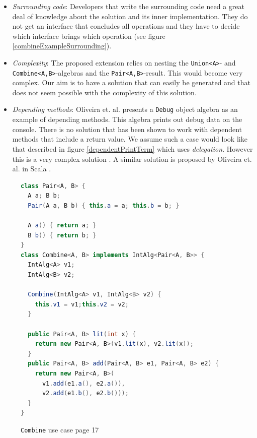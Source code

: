\documentclass{report}
\begin{document}
\begin{itemize}
  \item \emph{Surrounding code}: Developers that write the surrounding code need a great deal of knowledge about the solution and its inner implementation. They do not get an interface that concludes all operations and they have to decide which interface brings which operation (see figure \ref{combineExampleSurrounding}).
  \item \emph{Complexity}: The proposed extension relies on nesting the \lstinline{Union<A>}- and \lstinline{Combine<A,B>}-algebras and the \lstinline{Pair<A,B>}-result. This would become very complex. Our aim is to have a solution that can easily be generated and that does not seem possible with the complexity of this solution.
  \item \emph{Depending methods}: Oliveira et. al. presents a \lstinline{Debug} object algebra as an example of depending methods. This algebra prints out debug data on the console. There is no solution that has been shown to work with dependent methods that include a return value. We assume such a case would look like that described in figure \ref{dependentPrintTerm} which uses \emph{delegation}. However this is a very complex solution \cite{Tempero-Multiple-2000}. A similar solution is proposed by Oliveira et. al. in Scala \cite{Oliv-Feature-2013}.
\end{itemize}

\begin{figure}[H]
\begin{lstlisting}[language=java]
class Pair<A, B> {
  A a; B b;
  Pair(A a, B b) { this.a = a; this.b = b; }

  A a() { return a; }
  B b() { return b; }
}
class Combine<A, B> implements IntAlg<Pair<A, B>> {
  IntAlg<A> v1;
  IntAlg<B> v2;

  Combine(IntAlg<A> v1, IntAlg<B> v2) {
    this.v1 = v1;this.v2 = v2;
  }
  
  public Pair<A, B> lit(int x) {
    return new Pair<A, B>(v1.lit(x), v2.lit(x));
  }
  public Pair<A, B> add(Pair<A, B> e1, Pair<A, B> e2) {
    return new Pair<A, B>(
      v1.add(e1.a(), e2.a()),
      v2.add(e1.b(), e2.b()));
  }
}
\end{lstlisting}
\caption{\lstinline{Combine} use case \cite{Oliv-Extensibility-2012} page 17}
\label{combineExampleOliv}
\end{figure}
\end{document}
